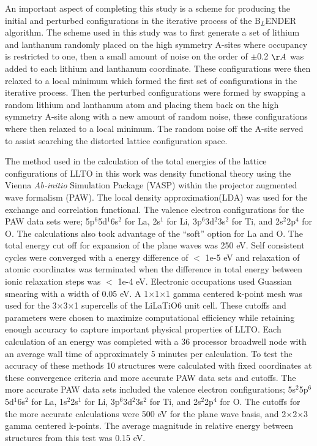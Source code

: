 \documentclass[aps,pre,reprint,superscriptaddress,showkeys]{revtex4-2}
\begin{document}
An important aspect of completing this study is a scheme for producing the initial and perturbed configurations in the iterative process of the B$_L$ENDER algorithm. The scheme used in this study was to first generate a set of lithium and lanthanum randomly placed on the high symmetry A-sites where occupancy is restricted to one, then a small amount of noise on the order of $\pm$0.2 $\AA$ was added to each lithium and lanthanum coordinate. These configurations were then relaxed to a local minimum which formed the first set of configurations in the iterative process.  Then the perturbed configurations  were formed by swapping a random lithium and lanthanum atom and placing them back on the high symmetry A-site along with a new amount of random noise, these configurations where then relaxed to a local minimum. The random noise off the A-site served to assist searching the distorted lattice configuration space. 

The method used in the calculation of the total energies of the lattice configurations of LLTO in this work was density functional theory using the Vienna \textit{Ab-initio} Simulation Package (VASP) \cite{Vasp1,Vasp2,Vasp3,Vasp4} within the projector augmented wave formalism (PAW)\cite{Blochl}. The local density approximation(LDA) was used for the exchange and correlation functional\cite{PBE}. The valence electron configurations for the PAW data sets were; 5p$^{6}$5d$^{1}$6s$^{2}$ for La, 2s$^{1}$ for Li, 3p$^{6}$3d$^{2}$3s$^{2}$ for Ti, and 2s$^{2}$2p$^{4}$ for O. The calculations also took advantage of the ``soft'' option for La and O.   The total energy cut off for expansion of the plane waves was 250 eV.  Self consistent cycles were converged with a energy difference of $<$ 1e-5 eV and relaxation  of atomic coordinates was terminated when the difference in total energy between ionic relaxation steps was $<$ 1e-4 eV. Electronic occupations used Guassian smearing with a width of 0.05 eV.  A 1$\times$1$\times$1 gamma centered k-point mesh was used for the 3$\times$3$\times$1 supercells of the LiLaTiO6 unit cell. These cutoffs and parameters were chosen to maximize computational efficiency while retaining enough accuracy to capture important physical properties of LLTO.  Each calculation of an energy was completed with a 36 processor broadwell node with an average wall time of approximately 5 minutes per calculation.  To test the accuracy of these methods 10 structures were calculated with fixed coordinates at these convergence criteria and more accurate PAW data sets and cutoffs. The more accurate PAW data sets included the valence electron configurations; 5s$^{2}$5p$^{6}$5d$^{1}$6s$^{2}$ for La, 1s$^2$2s$^{1}$ for Li, 3p$^{6}$3d$^{2}$3s$^{2}$ for Ti, and 2s$^{2}$2p$^{4}$ for O.  The cutoffs for the more accurate calculations were 500 eV for the plane wave basis, and 2$\times$2$\times$3 gamma centered k-points. The average magnitude  in relative energy between structures from this test was 0.15 eV. 
\end{document}
